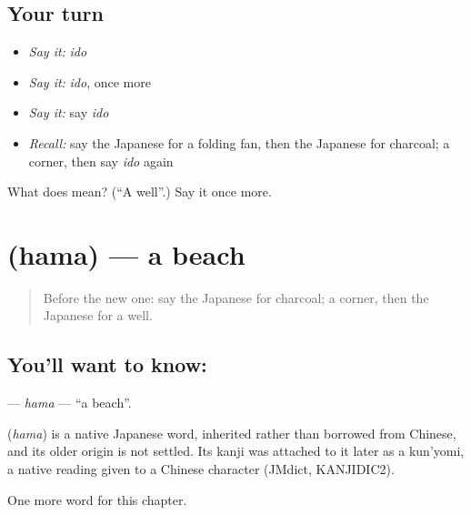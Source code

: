 \subsection*{Your turn}
\begin{itemize}
\raggedright
  \item \emph{Say it:} \emph{ido}
  \item \emph{Say it:} \emph{ido}, once more
  \item \emph{Say it:} say \emph{ido}
  \item \emph{Recall:} say the Japanese for a folding fan, then the Japanese for charcoal; a corner, then say \emph{ido} again
\end{itemize}

\begin{tcolorbox}[breakable,colback=teal!4,colframe=teal!35!black,title={Before you move on}]
What does  mean? (\textquotedblleft{}A well\textquotedblright{}.) Say it once more.
\end{tcolorbox}
\section[\texorpdfstring{\ja{はま} (hama)}{はま (hama)}]{ (hama) — a beach}

\label{lesson:JA-C67-hama}



\begin{quote}
Before the new one: say the Japanese for charcoal; a corner, then the Japanese for a well.
\end{quote}

\subsection*{You'll want to know: }
\textbf{} — \emph{hama} — \textquotedblleft{}a beach\textquotedblright{}.

\begin{cousinweb}
\textbf{} (\emph{hama}) is a native Japanese word, inherited rather than borrowed from Chinese, and its older origin is not settled. Its kanji was attached to it later as a kun'yomi, a native reading given to a Chinese character (JMdict, KANJIDIC2).
\end{cousinweb}

\begin{grammarlens}[title={What you've built}]
One more word for this chapter.
\end{grammarlens}

